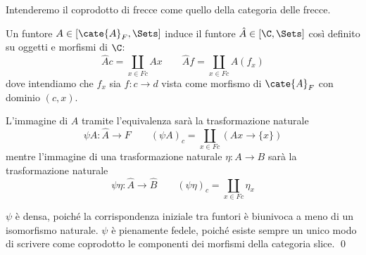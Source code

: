 \begin{oss}
{Intenderemo il coprodotto di frecce come quello della categoria delle frecce.

Un funtore $A\in[\cate{A}_F, \Sets]$ induce il funtore $\hat{A}\in[\C,\Sets]$ così definito su oggetti e morfismi di $\C$:
\[
\hat{A}c=\coprod_{x\in Fc}Ax
\qquad
\hat{A}f=\coprod_{x\in Fc}A(f_x)
\]
dove intendiamo che $f_x$ sia $f\colon c\to d$ vista come morfismo di $\cate{A}_F$ con dominio $(c,x)$.

L'immagine di $A$ tramite l'equivalenza sarà la trasformazione naturale
\[
\psi A\colon \hat{A} \to F
\qquad
(\psi A)_c = \coprod_{x\in Fc}\left(Ax\to\{x\}\right)
\]
mentre l'immagine di una trasformazione naturale $\eta\colon A\to B$ sarà la trasformazione naturale
\[
\psi \eta\colon \hat{A} \to \hat{B}
\qquad
(\psi \eta)_c = \coprod_{x\in Fc}\eta_x
\]

$\psi$ è densa, poiché la corrispondenza iniziale tra funtori è biunivoca a meno di un isomorfismo naturale. $\psi$ è pienamente fedele, poiché esiste sempre un unico modo di scrivere come coprodotto le componenti dei morfismi della categoria slice.
\qed}
\end{oss}


